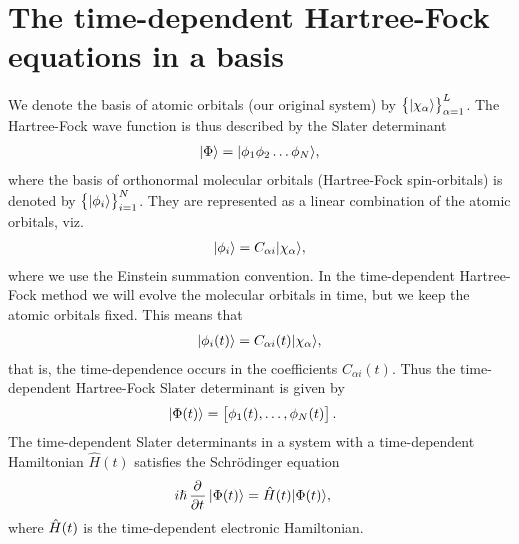 \section{The time-dependent Hartree-Fock equations in a basis}
    We denote the basis of atomic orbitals (our original system) by
    $\left\{ | \chi_\alpha \rangle \right\}_{\alpha = 1}^L$. The Hartree-Fock wave function is
    thus described by the Slater determinant
    \begin{align}
        | \Phi \rangle = | \phi_1 \phi_2 \dots \phi_N \rangle,
    \end{align}
    where the basis of orthonormal molecular orbitals (Hartree-Fock
    spin-orbitals) is denoted by $\left\{ | \phi_i \rangle \right\}_{i = 1}^N$. They are
    represented as a linear combination of the atomic orbitals, viz.
    \begin{align}
        | \phi_i \rangle = C_{\alpha i}| \chi_{\alpha} \rangle,
    \end{align}
    where we use the Einstein summation convention. In the time-dependent
    Hartree-Fock method we will evolve the molecular orbitals in time, but we
    keep the atomic orbitals fixed. This means that
    \begin{align}
        | \phi_i(t) \rangle = C_{\alpha i}(t)| \chi_{\alpha} \rangle,
    \end{align}
    that is, the time-dependence occurs in the coefficients $C_{\alpha i}(t)$.
    Thus the time-dependent Hartree-Fock Slater determinant is given by
    \begin{align}
        | \Phi(t) \rangle
        &=
        \left[ 
            \phi_1(t), \dots, \phi_N(t)
         \right].
    \end{align}
    The time-dependent Slater determinants in a system with a time-dependent
    Hamiltonian $\hat{H}(t)$ satisfies the Schrödinger equation
    \begin{align}
        i\hslash\dpd[]{}{t}\ket{\Phi(t)}
        &= \hamil(t)\ket{\Phi(t)},
    \end{align}
    where $\hat{H}(t)$ is the time-dependent electronic Hamiltonian.

